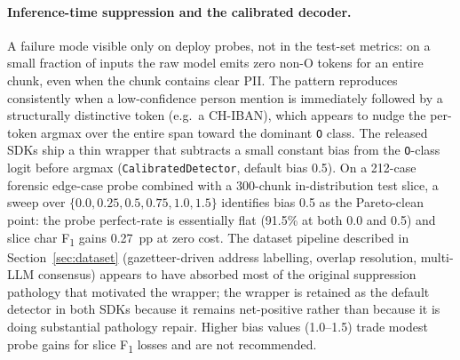\documentclass[sigconf,nonacm]{acmart}
\begin{document}
\paragraph{Inference-time suppression and the calibrated decoder.}
A failure mode visible only on deploy probes, not in the test-set
metrics: on a small fraction of inputs the raw model emits zero
non-O tokens for an entire chunk, even when the chunk contains
clear PII. The pattern reproduces consistently when a low-confidence
person mention is immediately followed by a structurally distinctive
token (e.g.\ a CH-IBAN), which appears to nudge the per-token
argmax over the entire span toward the dominant \texttt{O} class.
The released SDKs ship a thin wrapper that subtracts a small
constant bias from the \texttt{O}-class logit before argmax
(\texttt{CalibratedDetector}, default bias 0.5). On a 212-case
forensic edge-case probe combined with a 300-chunk in-distribution
test slice, a sweep over $\{0.0, 0.25, 0.5, 0.75, 1.0, 1.5\}$
identifies bias 0.5 as the Pareto-clean point: the probe
perfect-rate is essentially flat (91.5\% at both 0.0 and 0.5) and
slice char F\textsubscript{1} gains 0.27~pp at zero cost. The
dataset pipeline described in Section~\ref{sec:dataset}
(gazetteer-driven address labelling, overlap resolution, multi-LLM
consensus) appears to have absorbed most of the original
suppression pathology that motivated the wrapper; the wrapper is
retained as the default detector in both SDKs because it remains
net-positive rather than because it is doing substantial pathology
repair. Higher bias values (1.0--1.5) trade modest probe gains for
slice F\textsubscript{1} losses and are not recommended.
\end{document}
